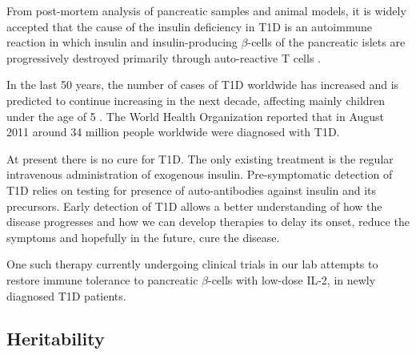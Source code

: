 From post-mortem analysis of pancreatic samples and animal models,
it is widely accepted that the cause of the insulin deficiency in \gls{T1D} is an autoimmune reaction
in which insulin and insulin-producing $\beta$-cells of the pancreatic islets
are progressively destroyed primarily through auto-reactive T cells \citep{Todd:2010bl}.  

In the last 50 years, the number of cases of T1D worldwide has increased and is predicted to continue increasing in the next decade,
affecting mainly children under the age of 5 \citep{Patterson:2009gj}.
The World Health Organization reported that in August 2011 around 34 million people worldwide were diagnosed with T1D.

At present there is no cure for \gls{T1D}.
The only existing treatment is the regular intravenous administration of exogenous insulin.  
Pre-symptomatic detection of T1D relies on testing for presence of auto-antibodies against insulin and its precursors.
Early detection of T1D allows a better understanding of how the disease progresses and how we can develop therapies to delay its onset,
reduce the symptoms and hopefully in the future, cure the disease.  

One such therapy currently undergoing clinical trials in our lab attempts to restore immune tolerance to pancreatic $\beta$-cells with low-dose \Gls{IL-2},
in newly diagnosed \gls{T1D} patients.


\subsection{Heritability}

